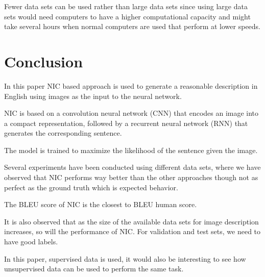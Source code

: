 \documentclass[a4paper,UKenglish,cleveref, autoref, thm-restate]{lipics-v2021}
\begin{document}
Fewer data sets can be used rather than large data sets since using large data sets would need computers to have a higher computational capacity and might take several hours when normal computers are used that perform at lower speeds.


\section{Conclusion}
\label{conclusion}
In this paper NIC based approach is used to generate a reasonable description in English using images as the input to the neural network.

NIC is based on a convolution neural network (CNN) that encodes an image into a compact representation, followed by a recurrent neural network (RNN) that generates the corresponding sentence.

The model is trained to maximize the likelihood of the sentence given the image.

Several experiments have been conducted using different data sets, where we have observed that NIC performs way better than the other approaches though not as perfect as the ground truth which is expected behavior.

The BLEU score of NIC is the closest to BLEU human score.

It is also observed that as the size of the available data sets for image description increases, so will the performance of NIC. For validation and test sets, we need to have good labels.

In this paper, supervised data is used, it would also be interesting to see how unsupervised data can be used to perform the same task.
















\appendix
\end{document}
